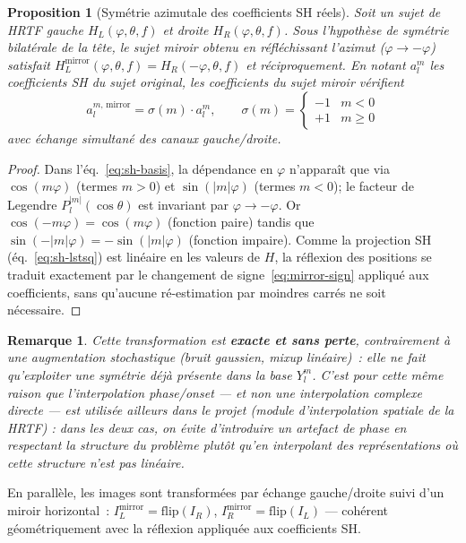 \documentclass[12pt, a4paper]{article}
\newtheorem{proposition}{Proposition}
\newtheorem{remarque}{Remarque}
\begin{document}
\begin{proposition}[Symétrie azimutale des coefficients SH réels]
Soit un sujet de HRTF gauche $H_L(\varphi,\theta,f)$ et droite
$H_R(\varphi,\theta,f)$. Sous l'hypothèse de symétrie bilatérale de la
tête, le sujet miroir obtenu en réfléchissant l'azimut ($\varphi \to
-\varphi$) satisfait
$H_L^{\mathrm{mirror}}(\varphi,\theta,f) = H_R(-\varphi,\theta,f)$ et
réciproquement. En notant $a_l^m$ les coefficients SH du sujet original,
les coefficients du sujet miroir vérifient
\begin{equation}
    a_l^{m,\,\mathrm{mirror}} = \sigma(m)\cdot a_l^{m},
    \qquad
    \sigma(m) = \begin{cases} -1 & m < 0 \\ +1 & m \geq 0 \end{cases}
    \label{eq:mirror-sign}
\end{equation}
avec échange simultané des canaux gauche/droite.
\end{proposition}

\begin{proof}
Dans l'éq.~\eqref{eq:sh-basis}, la dépendance en $\varphi$ n'apparaît que
via $\cos(m\varphi)$ (termes $m>0$) et $\sin(|m|\varphi)$ (termes $m<0$);
le facteur de Legendre $P_l^{|m|}(\cos\theta)$ est invariant par
$\varphi\to-\varphi$. Or $\cos(-m\varphi)=\cos(m\varphi)$ (fonction paire)
tandis que $\sin(-|m|\varphi) = -\sin(|m|\varphi)$ (fonction impaire).
Comme la projection SH (éq.~\eqref{eq:sh-lstsq}) est linéaire en les
valeurs de $H$, la réflexion des positions se traduit exactement par le
changement de signe~\eqref{eq:mirror-sign} appliqué aux coefficients, sans
qu'aucune ré-estimation par moindres carrés ne soit nécessaire.
\end{proof}

\begin{remarque}
Cette transformation est \textbf{exacte et sans perte}, contrairement à
une augmentation stochastique (bruit gaussien, \textit{mixup} linéaire)~:
elle ne fait qu'exploiter une symétrie déjà présente dans la base $Y_l^m$.
C'est pour cette même raison que l'interpolation phase/onset — et non une
interpolation complexe directe — est utilisée ailleurs dans le projet
(module d'interpolation spatiale de la HRTF) : dans les deux cas, on évite
d'introduire un artefact de phase en respectant la structure du problème
plutôt qu'en interpolant des représentations où cette structure n'est pas
linéaire.
\end{remarque}

En parallèle, les images sont transformées par échange gauche/droite suivi
d'un miroir horizontal~: $I_L^{\mathrm{mirror}} = \mathrm{flip}(I_R)$,
$I_R^{\mathrm{mirror}} = \mathrm{flip}(I_L)$ — cohérent géométriquement
avec la réflexion appliquée aux coefficients SH.
\end{document}
